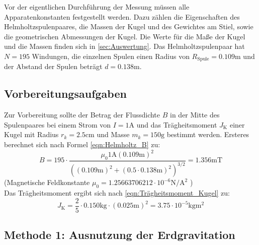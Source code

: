 Vor der eigentlichen Durchführung der Messung müssen alle Apparatenkonstanten festgestellt werden. Dazu zählen die Eigenschaften des Helmholtzspulenpaares, die Massen der 
Kugel und des Gewichtes am Stiel, sowie die geometrischen Abmessungen der Kugel. Die Werte für die Maße der Kugel und die Massen finden sich in \autoref{sec:Auswertung}.
Das Helmholtzspulenpaar hat $N = 195$ Windungen, die einzelnen Spulen einen Radius von $R_{\text{Spule}} = 0.109\unit{\metre}$ und der Abstand der Spulen beträgt
$d = 0.138\unit{\meter}$.

\subsection{Vorbereitungsaufgaben}
\label{subsec:Vorbereitungsaufgaben}

Zur Vorbereitung sollte der Betrag der Flussdichte $B$ in der Mitte des Spulenpaares bei einem Strom von $I = 1\unit{\ampere}$ und das Trägheitsmoment $J_{\text{K}}$
einer Kugel mit Radius $r_k = 2.5\unit{\centi\metre}$ und Masse $m_k = 150\unit{\gram}$ bestimmt werden.
Ersteres berechnet sich nach Formel \eqref{eqn:Helmholtz_B} zu:
\begin{equation*}
    B = 195 \cdot \frac{\mu_0 1\unit{\ampere}(0.109\unit{\metre})^2}{((0.109\unit{\metre})^2 + (0.5 \cdot 0.138\unit{\meter})^2)^{3/2}} = 1.356 \unit{\milli\tesla}
\end{equation*}
(Magnetische Feldkonstante $\mu_0 = 1.25663706212 \cdot 10^{-6} \unit{\newton\per\ampere\squared}$ \cite{scipy}) \\
Das Trägheitsmoment ergibt sich nach \eqref{eqn:Trägheitsmoment_Kugel} zu:
\begin{equation*}
    J_{\text{K}} = \frac{2}{5} \cdot 0.150\unit{\kilogram} \cdot (0.025\unit{\metre})^2 = 3.75 \cdot 10^{-5} \unit{\kilogram\metre\squared} 
\end{equation*}

\subsection{Methode 1: Ausnutzung der Erdgravitation}
\label{subsec:Methode1}

